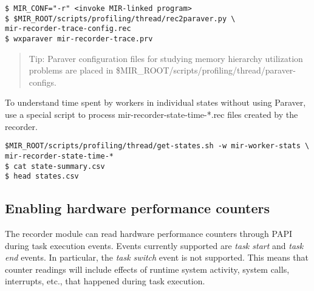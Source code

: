 \documentclass[11pt,a4paper]{article}
\begin{document}
\begin{lstlisting}[style=MyInputStyle]
$ MIR_CONF="-r" <invoke MIR-linked program>
$ $MIR_ROOT/scripts/profiling/thread/rec2paraver.py \
mir-recorder-trace-config.rec
$ wxparaver mir-recorder-trace.prv
\end{lstlisting}

\begin{framed}
\begin{quote}
Tip: Paraver configuration files for studying memory hierarchy utilization problems are placed in \textsf{\$MIR\_ROOT/scripts/profiling/thread/paraver-configs}.
\end{quote}
\end{framed}

To understand time spent by workers in individual states without using Paraver, use a special script to process \textsf{mir-recorder-state-time-*.rec} files created by the recorder.

\begin{lstlisting}[style=MyInputStyle]
$MIR_ROOT/scripts/profiling/thread/get-states.sh -w mir-worker-stats \
mir-recorder-state-time-*
$ cat state-summary.csv
$ head states.csv
\end{lstlisting}

\subsection{Enabling hardware performance counters}\label{sec:enabling-hardware-performance-counters}

The recorder module can read hardware performance counters through PAPI during task execution events. Events currently supported are \textit{task start} and \textit{task end} events.
In particular, the \textit{task switch} event is not supported.
This means that counter readings will include effects of runtime system activity, system calls, interrupts, etc., that happened during task execution.
\end{document}
